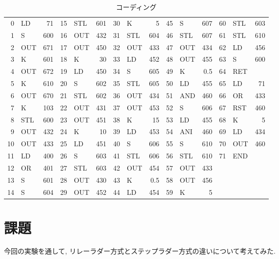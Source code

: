 \documentclass[titlepage]{jsarticle}
\begin{document}
    \begin{table}[h]
      \caption{コーディング}
      \label{tab:sig_code}
      \centering
      \begin{tabular}{r|lr||r|lr||r|lr||r|lr||r|lr}
        0 &  LD &  71 &  15 & STL & 601 & 30 & K &   5 &   45 & S &   607 & 60 & STL & 603 \\
        1 &  S &   600 & 16 & OUT & 432 & 31 & STL & 604 & 46 & STL & 607 & 61 & STL & 610 \\
        2 &  OUT & 671 & 17 & OUT & 450 & 32 & OUT & 433 & 47 & OUT & 434 & 62 & LD &  456 \\
        3 &  K &   601 & 18 & K &   30 &  33 & LD &  452 & 48 & OUT & 455 & 63 & S &   600 \\
        4 &  OUT & 672 & 19 & LD &  450 & 34 & S &   605 & 49 & K &   0.5 & 64 & RET & \\
        5 &  K &   610 & 20 & S &   602 & 35 & STL & 605 & 50 & LD &  455 & 65 & LD &  71 \\
        6 &  OUT & 670 & 21 & STL & 602 & 36 & OUT & 434 & 51 & AND & 460 & 66 & OR &  433 \\
        7 &  K &   103 & 22 & OUT & 431 & 37 & OUT & 453 & 52 & S &   606 & 67 & RST & 460 \\
        8 &  STL & 600 & 23 & OUT & 451 & 38 & K &   15 &  53 & LD &  455 & 68 & K &   5 \\
        9 &  OUT & 432 & 24 & K &   10 &  39 & LD &  453 & 54 & ANI & 460 & 69 & LD &  434 \\
        10 & OUT & 433 & 25 & LD &  451 & 40 & S &   606 & 55 & S &   610 & 70 & OUT & 460 \\
        11 & LD &  400 & 26 & S &   603 & 41 & STL & 606 & 56 & STL & 610 & 71 & END & \\
        12 & OR &  401 & 27 & STL & 603 & 42 & OUT & 454 & 57 & OUT & 433 & & & \\
        13 & S &   601 & 28 & OUT & 430 & 43 & K &   0.5 & 58 & OUT & 456 & & & \\
        14 & S &   604 & 29 & OUT & 452 & 44 & LD &  454 & 59 & K &   5 & & & \\
      \end{tabular}
    \end{table}
\section{課題}
  今回の実験を通して, リレーラダー方式とステップラダー方式の違いについて考えてみた.
\end{document}
